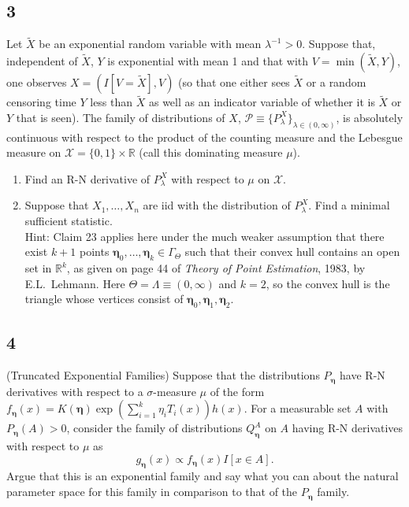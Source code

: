 \documentclass[12pt]{article}
\begin{document}
\newpage


\subsection*{3}
\begin{tcolorbox}
Let $\tilde{X}$ be an exponential random variable with mean $\lambda^{-1}>0$.    Suppose that, independent of $\tilde{X}$, $Y$ is exponential with mean 1
and that with $V = \min(\tilde{X},Y)$, one observes $X=(I[V=\tilde{X}],V)$ (so that one either sees $\tilde{X}$ or a random censoring time $Y$
less than $\tilde{X}$ as well as an indicator variable of whether it is $\tilde{X}$ or $Y$ that is seen).
The family of distributions of $X$, $\mathcal{P}\equiv \{P^X_\lambda\}_{\lambda \in (0,\infty)}$, is absolutely continuous with respect to the
product of the counting measure and the Lebesgue measure on $\mathcal{X}=\{0,1\}\times \mathbb{R}$ (call this dominating measure $\mu$).
\begin{enumerate}
  \item Find an R-N derivative of $P_\lambda^X$ with respect to $\mu$ on $\mathcal{X}$.
  \item Suppose that $X_1,\ldots,X_n$ are iid with the distribution of $P_\lambda^X$.  Find a minimal sufficient statistic. \\
    Hint: Claim 23 applies here under the much weaker assumption that there exist $k+1$ points $\bm{\eta}_0,\ldots,\bm{\eta}_k\in \Gamma_\Theta$ such
    that their convex hull contains an open set in $\mathbb{R}^k$, as given on page 44 of {\it Theory of Point Estimation}, 1983, by E.L.~Lehmann.  Here $\Theta=\Lambda \equiv (0,\infty)$ and $k=2$, so the convex hull is the triangle whose vertices consist of $\bm{\eta}_0,\bm{\eta}_1,\bm{\eta}_2$.
\end{enumerate}
\end{tcolorbox}


\subsection*{4}
\begin{tcolorbox}
(Truncated Exponential Families) Suppose that the distributions $P_{\bm{\eta}}$ have R-N derivatives with respect to a
$\sigma$-measure $\mu$ of the form $f_{\bm{\eta}}(x) = K(\bm{\eta}) \exp \left(  \sum_{i=1}^k \eta_i T_i(x)\right) h(x)$.
For a measurable set $A$ with $P_{\bm{\eta}}(A)>0$, consider the family of distributions $Q_{\bm{\eta}}^A$ on $A$ having R-N derivatives
with respect to $\mu$ as
\[
  g_{\bm{\eta}}(x ) \propto f_{\bm{\eta}}(x) I[x\in A].
\]
Argue that this is an exponential family and say what you can about the natural parameter space for this family in comparison to that of the $P_{\bm{\eta}}$ family.
\end{tcolorbox}
\end{document}
